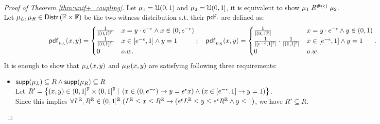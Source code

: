 \documentclass[a4paper,11pt]{article}
\begin{document}
%
\begin{proof}[Proof of Theorem \ref{thm:unif+_coupling}]
%
Let $\mu_1 = \mathcal{U}(0, 1]$ and $\mu_2 = \mathcal{U}(0, 1]$, it is equivalent to show 
${\mu_1} ~ R^{\#(\epsilon)} ~ \mu_2$.
%
%
%
\\
%
Let $\mu_L, \mu_R \in \mathsf{Distr}\left({\mathbb{F}} \times {\mathbb{F}}\right)$ 
be the two witness distribution s.t.
their $\mathsf{pdf}.$ are defined as:
{\small\[
	\mathsf{pdf}_{\mu_L}(x, y) = 
	\begin{cases}
	\frac{1}{\left \vert (0, 1]^{\mathbb{F}} \right \vert} 
	& x = y \cdot e^{-\epsilon} \land x \in (0, e^{-\epsilon})\\
	\frac{1}{\left \vert (0, 1]^{\mathbb{F}} \right \vert} 	
	& x \in [e^{-\epsilon}, 1] \land y = 1\\
	0       
	& o.w.
	\end{cases};
~~~
	\mathsf{pdf}_{\mu_R}(x, y) = 
	\begin{cases}
	\frac{1}{\left \vert (0, 1]^{\mathbb{F}} \right \vert}	
	& x = y \cdot e^{-\epsilon} \land y \in (0, 1)\\
	\frac{1}{\left \vert [e^{-\epsilon}, 1]^{\mathbb{F}} \right \vert} \cdot \frac{1}{\left \vert (0, 1]^{\mathbb{F}} \right \vert}
	& x \in [e^{-\epsilon}, 1] \land y = 1\\
	0       & o.w.
	\end{cases}.
\]
}
It is enough to show that $\mu_L(x, y)$ and $\mu_R(x, y)$ are satisfying following three requirements:
\begin{itemize}
	\item $\mathsf{supp}(\mu_L) \subseteq R \land \mathsf{supp}(\mu_R) \subseteq R$
%
\\
%
Let $R' =
		\left \{(x, y) \in (0, 1]^{\mathbb{F}} \times (0, 1]^{\mathbb{F}} 
		~|~
		(x \in (0, e^{-\epsilon}) \rightarrow y =  e^{\epsilon}  x)
		\land
		(x \in [e^{-\epsilon}, 1] \rightarrow y = 1 )
		\right \}$.
		\\
		Since this implies $
		\forall L^{\mathbb{R}}, R^{\mathbb{R}} \in (0,1]^{\mathbb{R}}. (
		L^{\mathbb{R}} \leq x \leq R^{\mathbb{R}}
		\rightarrow
		(e^{\epsilon} L^{\mathbb{R}} \leq y \leq 	e^{\epsilon} R^{\mathbb{R}}
		\land y \leq 1)$,
 we have $R' \subseteq R$.
%
%
\end{itemize}
\end{proof}
\end{document}
